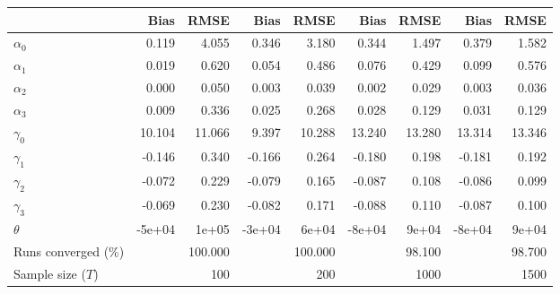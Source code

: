 
\begin{tabular}[t]{lrrrrrrrr}
\toprule
  & Bias & RMSE & Bias & RMSE & Bias & RMSE & Bias & RMSE\\
\midrule
$\alpha_{0}$ & 0.119 & 4.055 & 0.346 & 3.180 & 0.344 & 1.497 & 0.379 & 1.582\\
$\alpha_{1}$ & 0.019 & 0.620 & 0.054 & 0.486 & 0.076 & 0.429 & 0.099 & 0.576\\
$\alpha_{2}$ & 0.000 & 0.050 & 0.003 & 0.039 & 0.002 & 0.029 & 0.003 & 0.036\\
$\alpha_{3}$ & 0.009 & 0.336 & 0.025 & 0.268 & 0.028 & 0.129 & 0.031 & 0.129\\
$\gamma_{0}$ & 10.104 & 11.066 & 9.397 & 10.288 & 13.240 & 13.280 & 13.314 & 13.346\\
$\gamma_{1}$ & -0.146 & 0.340 & -0.166 & 0.264 & -0.180 & 0.198 & -0.181 & 0.192\\
$\gamma_{2}$ & -0.072 & 0.229 & -0.079 & 0.165 & -0.087 & 0.108 & -0.086 & 0.099\\
$\gamma_{3}$ & -0.069 & 0.230 & -0.082 & 0.171 & -0.088 & 0.110 & -0.087 & 0.100\\
$\theta$ & -5e+04 & 1e+05 & -3e+04 & 6e+04 & -8e+04 & 9e+04 & -8e+04 & 9e+04\\
Runs converged (\%) &  & 100.000 &  & 100.000 &  & 98.100 &  & 98.700\\
Sample size ($T$) &  & 100 &  & 200 &  & 1000 &  & 1500\\
\bottomrule
\end{tabular}
